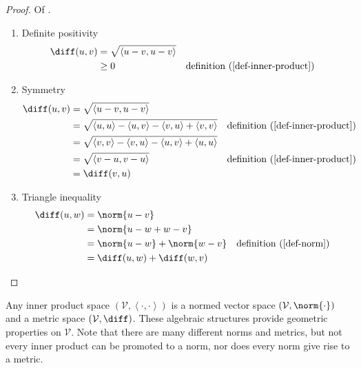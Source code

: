\begin{proof}
	Of .
	\begin{flushleft}
		\begin{enumerate}
			\item Definite positivity
			      \begin{align*}
				      \diff(u,v) & = \sqrt{\left<u-v,u-v\right>}                                                  \\
				                 & \geq0                         &  & \text{\pref{definition}{def-inner-product}}
			      \end{align*}
			\item Symmetry
			      \begin{align*}
				      \diff(u,v) & = \sqrt{\left<u-v,u-v\right>}                                                                                                 \\
				                 & = \sqrt{\left<u,u\right>-\left<u,v\right>-\left<v,u\right>+\left<v,v\right>} &  & \text{\pref{definition}{def-inner-product}} \\
				                 & = \sqrt{\left<v,v\right>-\left<v,u\right>-\left<u,v\right>+\left<u,u\right>}                                                  \\
				                 & = \sqrt{\left<v-u,v-u\right>}                                                &  & \text{\pref{definition}{def-inner-product}} \\
				                 & = \diff(v,u)
			      \end{align*}
			\item Triangle inequality
			      \begin{align*}
				      \diff(u,w) & = \norm{u-v}                                                      \\
				                 & = \norm{u-w+w-v}                                                  \\
				                 & = \norm{u-w} + \norm{w-v} &  & \text{\pref{definition}{def-norm}} \\
				                 & = \diff(u,w) + \diff(w,v)
			      \end{align*}
		\end{enumerate}
	\end{flushleft}
\end{proof}

\begin{rem}
	Any inner product space $(\mathcal{V},\left<\cdot,\cdot\right>)$ is a normed
	vector space $(\mathcal{V},\norm{\cdot})$ and a metric space $(\mathcal{V},\diff)$.
	These algebraic structures provide geometric properties on $\mathcal{V}$. Note
	that there are many different norms and metrics, but not every inner product
	can be promoted to a norm, nor does every norm give rise to a metric.
\end{rem}

